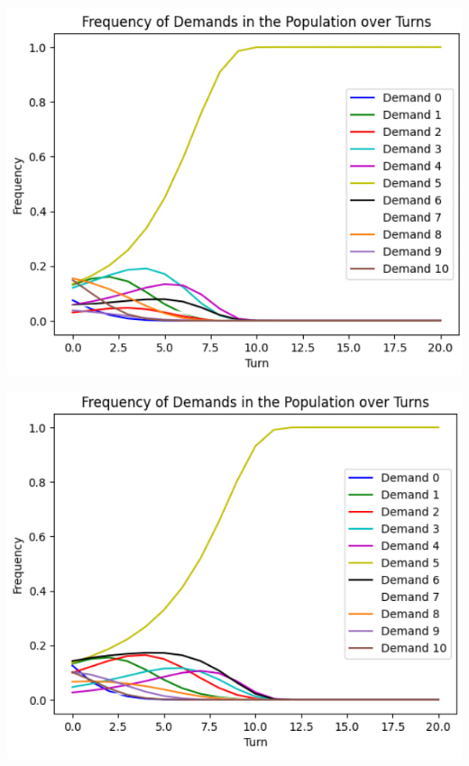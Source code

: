 \begin{center}
	\includegraphics{4}
\end{center}

\begin{center}
	\includegraphics{5}
\end{center}

